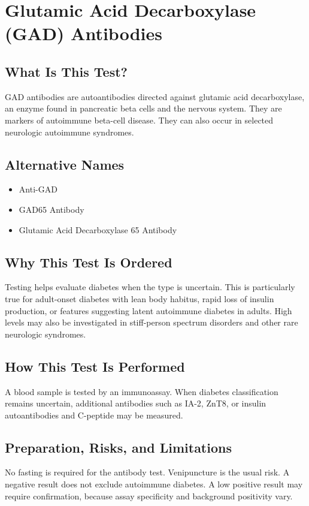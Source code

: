 \chapter{Glutamic Acid Decarboxylase (GAD) Antibodies}

\section*{What Is This Test?}
GAD antibodies are autoantibodies directed against glutamic acid decarboxylase, an enzyme found in pancreatic beta cells and the nervous system. They are markers of autoimmune beta-cell disease. They can also occur in selected neurologic autoimmune syndromes.

\section*{Alternative Names}
\begin{itemize}
  \item Anti-GAD
  \item GAD65 Antibody
  \item Glutamic Acid Decarboxylase 65 Antibody
\end{itemize}
\section*{Why This Test Is Ordered}
Testing helps evaluate diabetes when the type is uncertain. This is particularly true for adult-onset diabetes with lean body habitus, rapid loss of insulin production, or features suggesting latent autoimmune diabetes in adults. High levels may also be investigated in stiff-person spectrum disorders and other rare neurologic syndromes.

\section*{How This Test Is Performed}
A blood sample is tested by an immunoassay. When diabetes classification remains uncertain, additional antibodies such as IA-2, ZnT8, or insulin autoantibodies and C-peptide may be measured.

\section*{Preparation, Risks, and Limitations}
No fasting is required for the antibody test. Venipuncture is the usual risk. A negative result does not exclude autoimmune diabetes. A low positive result may require confirmation, because assay specificity and background positivity vary.

